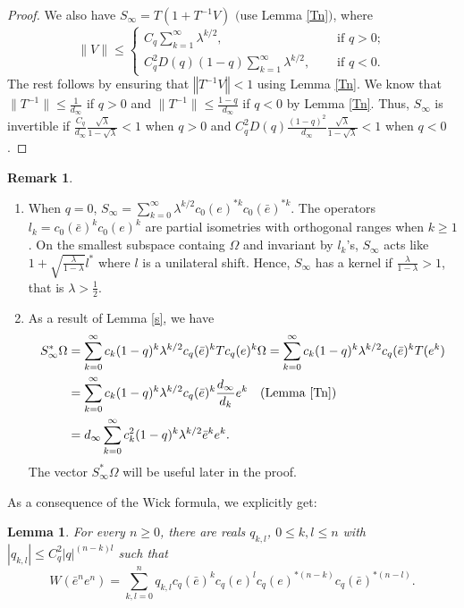 \documentclass[12pt, a4paper,reqno]{amsart}
\newtheorem{Lemma}[Theorem]{Lemma}
\theoremstyle{definition}
\newtheorem{Remark}[Theorem]{Remark}
\renewcommand{\leq}{\leqslant}
\renewcommand{\geq}{\geqslant}
\newcommand{\norm}[1]{\left\Vert#1\right\Vert}
\begin{document}
\begin{proof}
We also have $S_\infty=T(1+T^{-1}V)$ $($use Lemma \ref{Tn}$)$, where 
\begin{equation*}
\|V\| \leq \begin{cases} C_q \sum_{k=1}^\infty {\lambda}^{k/2},\quad &\text{ if } q>0;\\ C_q^2D(q)(1-q) \sum_{k=1}^\infty {\lambda}^{k/2},\quad &\text{ if } q<0.\end{cases} 
\end{equation*}
The rest follows by ensuring that $\norm{T^{-1}V}<1$ using Lemma \ref{Tn}. We know that $\|T^{-1}\|\leq \frac{1}{d_\infty}$ if $q>0$ and $\|T^{-1}\|\leq \frac{1-q}{d_\infty}$ if $q<0$ by Lemma \ref{Tn}.  Thus, $S_\infty$ is invertible if $\frac{C_q}{d_\infty} \frac {\sqrt \lambda}{1-\sqrt{\lambda}} <1$ when $q>0$ and $C_q^2D(q)\frac{(1-q)^2}{d_\infty} \frac {\sqrt \lambda}{1-\sqrt{\lambda}} <1$ when $q<0$.
\end{proof}	

\begin{Remark}\label{Rem1} $ $
\begin{enumerate}
\item When $q=0$, $S_\infty=\sum_{k=0}^\infty \lambda^{k/2} c_0(e)^{*k}c_0(\bar e)^{*k}$. The operators $l_k=c_0(\bar e)^kc_0( e)^{k}$ are partial isometries with orthogonal ranges {when $k\geq 1$}. On the smallest subspace containg $\Omega$ and invariant by $l_k$'s,  $S_\infty$ acts like $ 1+ \sqrt{\frac \lambda {1-\lambda}}l^*$ where $l$ is a unilateral shift. Hence, $S_\infty$ has a kernel if  $\frac \lambda {1-\lambda}>1$, that is $\lambda>\frac 12$.
%
\item As a result of Lemma \ref{s}, we have 
\begin{align*}
S_\infty^*\Omega&= \sum_{k=0}^\infty c_k(1-q)^k\lambda^{k/2} c_q(\bar e)^kTc_q(e)^k\Omega
=\sum_{k=0}^\infty c_k(1-q)^k\lambda^{k/2} c_q(\bar e)^kT(e^k)\\
&=\sum_{k=0}^\infty c_k(1-q)^k\lambda^{k/2} c_q(\bar e)^k\frac{d_\infty}{d_k}e^k \quad(\text{Lemma \ref{Tn}})\\
&=d_\infty\sum_{k=0}^\infty c_k^2(1-q)^k\lambda^{k/2}{\bar e}^ke^k.
\end{align*}
The vector $S_\infty^*\Omega$ will be useful later in the proof. 
\end{enumerate}
\end{Remark}

As a consequence of the Wick formula, we explicitly get:
\begin{Lemma}\label{ween}
For every $n\geq0$, there are reals $q_{k,l}$, $0\leq k,l\leq n$ with $|q_{k,l}|\leq C_q^2 |q|^{(n-k)l}$ such that
$$W(\bar e^n e^n)=\sum_{k,l=0}^n q_{k,l}  c_q(\bar e)^kc_q( e)^l c_q(e)^{* {(n-k)}}c_q(\bar e)^{*(n-l)}.$$
\end{Lemma}
\end{document}
